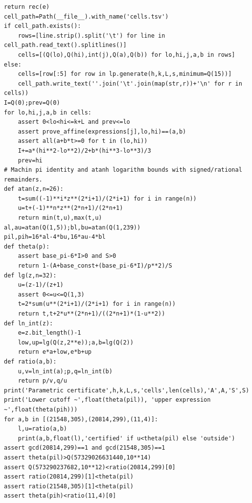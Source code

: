 \documentclass[11pt,a4paper]{article}
\begin{document}
\begin{Verbatim}[fontsize=\footnotesize,breakanywhere=false]
    return rec(e)
cell_path=Path(__file__).with_name('cells.tsv')
if cell_path.exists():
    rows=[line.strip().split('\t') for line in cell_path.read_text().splitlines()]
    cells=[(Q(lo),Q(hi),int(j),Q(a),Q(b)) for lo,hi,j,a,b in rows]
else:
    cells=[row[:5] for row in lp.generate(h,k,L,s,minimum=Q(15))]
    cell_path.write_text(''.join('\t'.join(map(str,r))+'\n' for r in cells))
I=Q(0);prev=Q(0)
for lo,hi,j,a,b in cells:
    assert 0<lo<hi<=k+L and prev<=lo
    assert prove_affine(expressions[j],lo,hi)==(a,b)
    assert all(a+b*t>=0 for t in (lo,hi))
    I+=a*(hi**2-lo**2)/2+b*(hi**3-lo**3)/3
    prev=hi
# Machin pi identity and atanh logarithm bounds with signed/rational remainders.
def atan(z,n=26):
    t=sum((-1)**i*z**(2*i+1)/(2*i+1) for i in range(n))
    u=t+(-1)**n*z**(2*n+1)/(2*n+1)
    return min(t,u),max(t,u)
al,au=atan(Q(1,5));bl,bu=atan(Q(1,239))
pil,pih=16*al-4*bu,16*au-4*bl
def theta(p):
    assert base_pi-6*I>0 and S>0
    return 1-(A+base_const+(base_pi-6*I)/p**2)/S
def lg(z,n=32):
    u=(z-1)/(z+1)
    assert 0<=u<=Q(1,3)
    t=2*sum(u**(2*i+1)/(2*i+1) for i in range(n))
    return t,t+2*u**(2*n+1)/((2*n+1)*(1-u**2))
def ln_int(z):
    e=z.bit_length()-1
    low,up=lg(Q(z,2**e));a,b=lg(Q(2))
    return e*a+low,e*b+up
def ratio(a,b):
    u,v=ln_int(a);p,q=ln_int(b)
    return p/v,q/u
print('Parametric certificate',h,k,L,s,'cells',len(cells),'A',A,'S',S)
print('Lower cutoff ~',float(theta(pil)), 'upper expression ~',float(theta(pih)))
for a,b in [(21548,305),(20814,299),(11,4)]:
    l,u=ratio(a,b)
    print(a,b,float(l),'certified' if u<theta(pil) else 'outside')
assert gcd(20814,299)==1 and gcd(21548,305)==1
assert theta(pil)>Q(57329026631440,10**14)
assert Q(573290237682,10**12)<ratio(20814,299)[0]
assert ratio(20814,299)[1]<theta(pil)
assert ratio(21548,305)[1]<theta(pil)
assert theta(pih)<ratio(11,4)[0]
\end{Verbatim}
\end{document}
